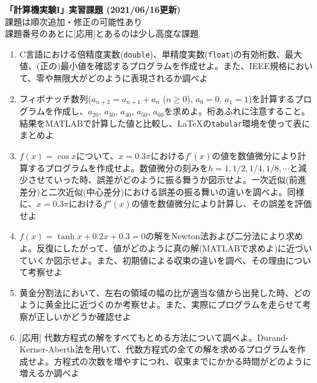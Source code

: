 \documentclass[11pt]{jarticle}
\begin{document}
\noindent
{\bf\large 「計算機実験I」実習課題 (2021/06/16更新)}
\\[-0.5em]

\noindent
課題は順次追加・修正の可能性あり\\[-0.5em]

\noindent
課題番号のあとに[応用]とあるのは少し高度な課題\\[-0.5em]

\begin{enumerate}
\renewcommand{\labelenumi}{1-\arabic{enumi})}

\item C言語における倍精度実数({\tt double})、単精度実数({\tt float})の有効桁数、最大値、(正の)最小値を確認するプログラムを作成せよ。また、IEEE規格において、零や無限大がどのように表現されるか調べよ
  
\item フィボナッチ数列($a_{n+2}=a_{n+1}+a_n$ ($n \ge 0$), $a_0=0$, $a_1=1$)を計算するプログラムを作成し、$a_{20}$, $a_{30}$, $a_{40}$, $a_{50}$, $a_{60}$を求めよ。桁あふれに注意すること。結果をMATLABで計算した値と比較し、\LaTeX の{\tt tabular}環境を使って表にまとめよ
  
\item $f(x)=\cos x$について、$x=0.3\pi$における$f'(x)$の値を数値微分により計算するプログラムを作成せよ。数値微分の刻みを$h=1,1/2,1/4,1/8,\cdots$と減少させていった時、誤差がどのように振る舞うか図示せよ。一次近似(前進差分)と二次近似(中心差分)における誤差の振る舞いの違いを調べよ。同様に、$x=0.3\pi$における$f''(x)$の値を数値微分により計算し、その誤差を評価せよ
  
\item $f(x)=\tanh x + 0.2 x + 0.3 = 0$の解をNewton法および二分法により求めよ。反復にしたがって、値がどのように真の解(MATLABで求めよ)に近づいていくか図示せよ。また、初期値による収束の違いを調べ、その理由について考察せよ
  
\item 黄金分割法において、左右の領域の幅の比が適当な値から出発した時、どのように黄金比に近づくのか考察せよ。また、実際にプログラムを走らせて考察が正しいかどうか確認せよ

\item \mbox{} [応用] 代数方程式の解をすべてもとめる方法について調べよ。Durand-Kerner-Aberth法を用いて、代数方程式の全ての解を求めるプログラムを作成せよ。方程式の次数を増やすにつれ、収束までにかかる時間がどのように増えるか調べよ

\end{enumerate}
\end{document}
